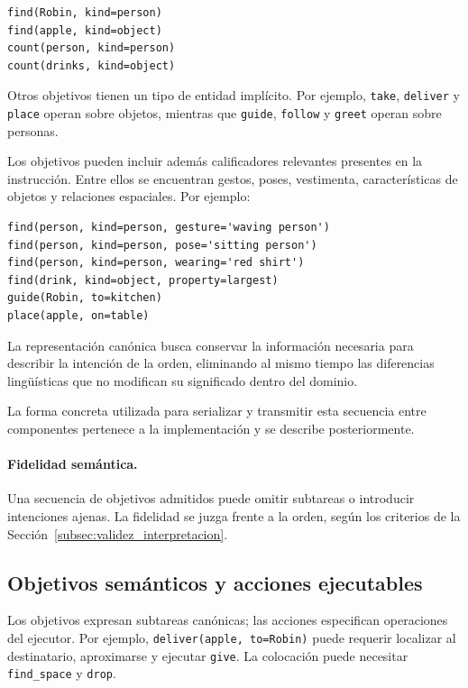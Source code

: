 \begin{verbatim}
find(Robin, kind=person)
find(apple, kind=object)
count(person, kind=person)
count(drinks, kind=object)
\end{verbatim}

Otros objetivos tienen un tipo de entidad implícito. Por ejemplo,
\texttt{take}, \texttt{deliver} y \texttt{place} operan sobre
objetos, mientras que \texttt{guide}, \texttt{follow} y \texttt{greet} operan
sobre personas.

Los objetivos pueden incluir además calificadores relevantes presentes en la
instrucción. Entre ellos se encuentran gestos, poses, vestimenta,
características de objetos y relaciones espaciales. Por ejemplo:

\begin{verbatim}
find(person, kind=person, gesture='waving person')
find(person, kind=person, pose='sitting person')
find(person, kind=person, wearing='red shirt')
find(drink, kind=object, property=largest)
guide(Robin, to=kitchen)
place(apple, on=table)
\end{verbatim}

La representación canónica busca conservar la información necesaria para
describir la intención de la orden, eliminando al mismo tiempo las diferencias
lingüísticas que no modifican su significado dentro del dominio.

La forma concreta utilizada para serializar y transmitir esta secuencia entre
componentes pertenece a la implementación y se describe posteriormente.


\paragraph{Fidelidad semántica.}
\label{subsubsec:fidelidad_semantica}
Una secuencia de objetivos admitidos puede omitir subtareas o introducir intenciones ajenas. La fidelidad se juzga frente a la orden, según los criterios de la Sección~\ref{subsec:validez_interpretacion}.

\subsection{Objetivos semánticos y acciones ejecutables}
\label{subsec:objetivos_acciones}

Los objetivos expresan subtareas canónicas; las acciones especifican operaciones del ejecutor. Por ejemplo, \texttt{deliver(apple, to=Robin)} puede requerir localizar al destinatario, aproximarse y ejecutar \texttt{give}. La colocación puede necesitar \texttt{find\_space} y \texttt{drop}.

